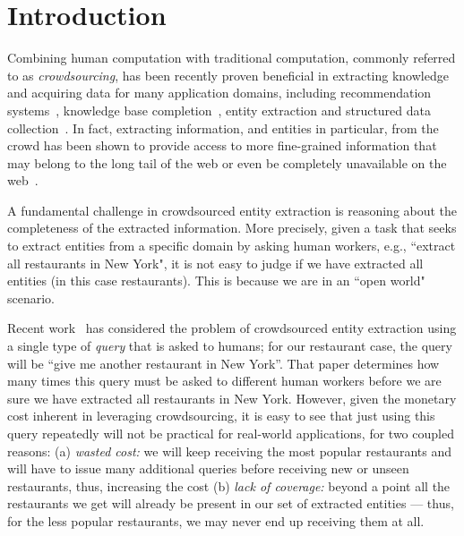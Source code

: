 


\section{Introduction}
\label{sec:intro}
Combining human computation with traditional computation, commonly referred to as {\em crowdsourcing}, has been recently proven beneficial in extracting knowledge and acquiring data for many application domains, including recommendation systems~\cite{amsterdamer:2014}, knowledge base completion~\cite{kondredi:2014}, entity extraction and structured data collection~\cite{park:2014,trushkowsky:2013}. In fact, extracting information, and entities in particular, from the crowd has been shown to provide access to more fine-grained information that may belong to the long tail of the web or even be completely unavailable on the web~\cite{franklin:2011, Parameswaran:2012, west:2014}.

A fundamental challenge in crowdsourced entity extraction is reasoning about the completeness of the extracted information. More precisely, given a task that seeks to extract entities from a specific domain by asking human workers, e.g., ``extract all restaurants in New York", it is not easy to judge if we have extracted all entities (in this case restaurants). This is because we are in an ``open world"~\cite{franklin:2011} scenario. 

Recent work~\cite{trushkowsky:2013} has considered the problem of crowdsourced entity extraction using a single type of {\em query} that is asked to humans; for our restaurant case, the query will be ``give me another restaurant in New York''. That paper determines how many times this query must be asked to different human workers before we are sure we have extracted all restaurants in New York. However, given the monetary cost inherent in leveraging crowdsourcing, it is easy to see that just using this query repeatedly will not be practical for real-world applications, for two coupled reasons: (a) {\em wasted cost:} we will keep receiving the most popular restaurants and will have to issue many additional queries before receiving new or unseen restaurants, thus, increasing the cost (b) {\em lack of coverage:}  beyond a point all the restaurants we get will already be present in our set of extracted entities --- thus, for the less popular restaurants, we may never end up receiving them at all.

